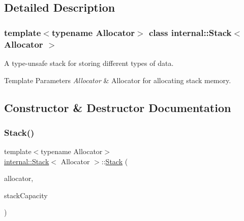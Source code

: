 \subsection{Detailed Description}
\subsubsection*{template$<$typename Allocator$>$\newline
class internal\+::\+Stack$<$ Allocator $>$}

A type-\/unsafe stack for storing different types of data. 


\begin{DoxyTemplParams}{Template Parameters}
{\em Allocator} & Allocator for allocating stack memory. \\
\hline
\end{DoxyTemplParams}


\subsection{Constructor \& Destructor Documentation}
\mbox{\label{classinternal_1_1Stack_af09ab91f9e5143deccf7c9af837f451e}} 
\subsubsection{\texorpdfstring{Stack()}{Stack()}\hspace{0.1cm}{\footnotesize\ttfamily [1/2]}}
{\footnotesize\ttfamily template$<$typename Allocator$>$ \\
\hyperlink{classinternal_1_1Stack}{internal\+::\+Stack}$<$ Allocator $>$\+::\hyperlink{classinternal_1_1Stack}{Stack} (\begin{DoxyParamCaption}\item[{Allocator $\ast$}]{allocator,  }\item[{size\+\_\+t}]{stack\+Capacity }\end{DoxyParamCaption})\hspace{0.3cm}{\ttfamily [inline]}}

\mbox{\label{classinternal_1_1Stack_afedce84c8816abe9277a71ebd5e1808a}} 

